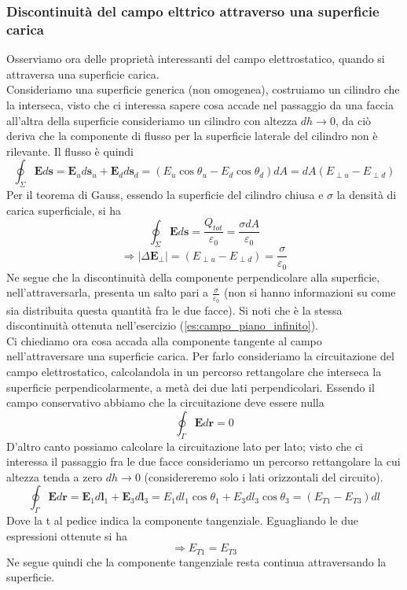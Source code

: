 \documentclass[10pt,a4paper]{article}
\begin{document}
\subsubsection{Discontinuità del campo elttrico attraverso una superficie carica}
Osserviamo ora delle proprietà interessanti del campo elettrostatico, quando si attraversa una superficie carica.\\
Consideriamo una superficie generica (non omogenea), costruiamo un cilindro che la interseca, visto che ci interessa sapere cosa accade nel passaggio da una faccia all'altra della superficie consideriamo un cilindro con altezza \(dh\to 0\), da ciò deriva che la componente di flusso per la superficie laterale del cilindro non è rilevante. Il flusso è quindi
\[\oint_{\Sigma}\mathbf{E}d\mathbf{s} = \mathbf{E}_{u}d\mathbf{s}_{u}+\mathbf{E}_{d}d\mathbf{s}_d=(E_u\cos\theta_u-E_d\cos\theta_d)dA = dA(E_{\perp u}-E_{\perp d})\] 
Per il teorema di Gauss, essendo la superficie del cilindro chiusa e $\sigma$ la densità di carica superficiale, si ha
\[\oint_{\Sigma}\mathbf{E}d\mathbf{s} = \frac{Q_{tot}}{\varepsilon_0} = \frac{\sigma dA}{\varepsilon_0}\] 
\[\Rightarrow |\Delta \mathbf{E}_{\perp}| = (E_{\perp u} - E_{\perp d}) = \frac{\sigma}{\varepsilon_0}\]
Ne segue che la discontinuità della componente perpendicolare alla superficie, nell'attraversarla, presenta un salto pari a \(\frac{\sigma}{\varepsilon_0}\) (non si hanno informazioni su come sia distribuita questa quantità fra le due facce). Si noti che è la stessa discontinuità ottenuta nell'esercizio (\ref{es:campo_piano_infinito}).\\
Ci chiediamo ora cosa accada alla componente tangente al campo nell'attraversare una superficie carica. Per farlo consideriamo la circuitazione del campo elettrostatico, calcolandola in un percorso rettangolare che interseca la superficie perpendicolarmente, a metà dei due lati perpendicolari. Essendo il campo conservativo abbiamo che la circuitazione deve essere nulla
\[\oint_\Gamma\mathbf{E}d\mathbf{r} = 0\]
D'altro canto possiamo calcolare la circuitazione lato per lato; visto che ci interessa il passaggio fra le due facce consideriamo un percorso rettangolare la cui altezza tenda a zero \(dh\to 0\) (considereremo solo i lati orizzontali del circuito).  
\[\oint_\Gamma \mathbf{E}d\mathbf{r} = \mathbf{E}_1 d\mathbf{l}_1 + \mathbf{E}_3d\mathbf{l}_3 = E_1dl_1\cos\theta_1 + E_3dl_3\cos\theta_3 = (E_{T1}-E_{T3})dl\]
Dove la t al pedice indica la componente tangenziale. Eguagliando le due espressioni ottenute si ha
\[\Rightarrow E_{T1}=E_{T3}\]
Ne segue quindi che la componente tangenziale resta continua attraversando la superficie. 
\end{document}
